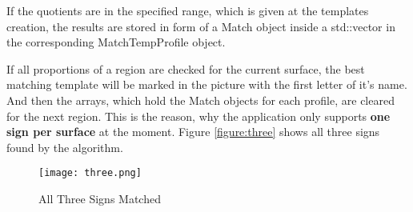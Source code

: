 If the quotients are in the specified range, which is given at the templates creation, the results 
are stored in form of a Match object inside a std::vector in the corresponding MatchTempProfile object.

If all proportions of a region are checked for the current surface, the best matching template will
be marked in the picture with the first letter of it's name. And then the arrays,
which hold the Match objects for each profile, are cleared for the next region. This is the reason, 
why the application only supports \textbf{one sign per surface} at the moment.
Figure \vref{figure:three} shows all three signs found by the algorithm.

\begin{figure}[H]
\begin{center}
  \texttt{[image: three.png]}
  \caption[All Three Signs Matched]{All Three Signs Matched\footnotemark}
  \label{figure:three}
\end{center}
\end{figure}
